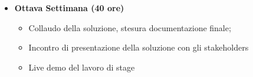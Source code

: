 {\begin{itemize}
\begin{itemize}
    \item Conclusione codifica e stesura dei test;
    \item Stesura della documentazione relativa al periodo di
      codifica;
    \end{itemize}
  \item \textbf{Ottava Settimana (40 ore)}
    \begin{itemize}
    \item Collaudo della soluzione, stesura documentazione finale;
    \item Incontro di presentazione della soluzione con gli
      stakeholders
    \item Live demo del lavoro di stage
    \end{itemize}
  \end{itemize}
}

\newcommand{\totaleOre}{300}

\newcommand{\obiettiviObbligatori}{
\item \underline{\textit{O01}}: Studio della tecnologia blockchain;
\item \underline{\textit{O02}}: Studio dell'estensione ethereum;
\item \underline{\textit{O03}}: Studio del linguaggio solidity;
\item \underline{\textit{O04}}: Studio degli standard per la gestione di non fungible token (NFT);
\item \underline{\textit{O05}}: implementazione di contratti in catena per la gestione di NFT;
}

\newcommand{\obiettiviDesiderabili}{
\item \underline{\textit{D01}}: primo obiettivo;
}

\newcommand{\obiettiviFacoltativi}{
\item \underline{\textit{F01}}: primo obiettivo;
}
